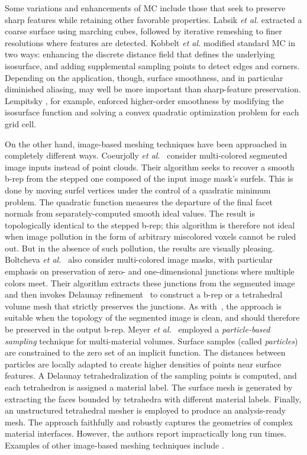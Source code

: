 Some variations and enhancements of MC include those that seek to preserve sharp features while retaining other favorable properties.  Labsik \textit{et al.} \cite{labsik_2002} extracted a coarse surface using marching cubes, followed by iterative remeshing to finer resolutions where features are detected.  Kobbelt \textit{et al.} \cite{kobbelt_2001} modified standard MC in two ways:  enhancing the discrete distance field that defines the underlying isosurface, and adding supplemental sampling points to detect edges and corners. Depending on the application, though, surface smoothness, and in particular diminished aliasing, may well be more important than sharp-feature preservation. Lempitsky \cite{lempitsky_2010}, for example, enforced higher-order smoothness by modifying the isosurface function and solving a convex quadratic optimization problem for each grid cell.

On the other hand, image-based meshing techniques have been approached in completely different ways.  Coeurjolly \textit{et al.}~\cite{coeurjolly2021} consider multi-colored segmented image inputs instead of point clouds.  Their algorithm seeks to recover a smooth b-rep from the stepped one composed of the input image mask's surfels.  This is done by moving surfel vertices under the control of a quadratic minimum problem.  The quadratic function measures the departure of the final facet normals from separately-computed smooth ideal values.  The result is topologically identical to the stepped b-rep; this algorithm is therefore not ideal when image pollution in the form of arbitrary miscolored voxels cannot be ruled out.  But in the absence of such pollution, the results are visually pleasing.  Boltcheva \textit{et al.}~\cite{boltcheva2009} also consider multi-colored image masks, with particular emphasis on preservation of zero- and one-dimensional junctions where multiple colors meet.  Their algorithm extracts these junctions from the segmented image and then invokes Delaunay refinement~\cite{pons2007} to construct a b-rep or a tetrahedral volume mesh that strictly preserves the junctions.  As with~\cite{coeurjolly2021}, the approach is suitable when the topology of the segmented image is clean, and should therefore be preserved in the output b-rep. Meyer \textit{et al.}~\cite{meyer_2008} employed a \textit{particle-based sampling} technique for multi-material volumes. Surface samples (called \textit{particles}) are constrained to the zero set of an implicit function. The distances between particles are locally adapted to create higher densities of points near surface features. A Delaunay tetrahedralization of the sampling points is computed, and each tetrahedron is assigned a material label. The surface mesh is generated by extracting the faces bounded by tetrahedra with different material labels. Finally, an unstructured tetrahedral mesher is employed to produce an analysis-ready mesh. The approach faithfully and robustly captures the geometries of complex material interfaces. However, the authors report impractically long run times.
Examples of other image-based meshing techniques include \cite{fang_2009, mohamed_2004, jermyn_2013, boissonnat_2009}.

